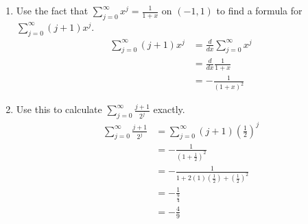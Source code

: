 \documentclass{article}
\begin{document}
\begin{enumerate}
\begin{enumerate}
\begin{proof}
                              Because $f(x)$ is continuously differentiable, we can be certain that
                              \begin{align*}
                                    \frac{d}{dx}\sum_{j=0}^\infty x^j & = \sum_{j=0}^\infty \frac{d}{dx} x^j \\
                                                                      & = \sum_{j=0}^\infty jx^{j-1}         \\
                                                                      & = 0 + \sum_{j=1}^\infty jx^{j-1}     \\
                                                                      & = \sum_{j=0}^\infty(j+1)x_j.
                              \end{align*}
                        \end{proof}
                  \item Use the fact that $\sum_{j=0}^\infty x^j=\frac{1}{1+x}$ on
                        $(-1,1)$ to find a formula for $\sum_{j=0}^\infty(j+1)x^j$.
                        \begin{align*}
                              \sum_{j=0}^\infty(j+1)x^j & = \frac{d}{dx}\sum_{j=0}^\infty x^j \\
                                                        & = \frac{d}{dx}\frac{1}{1+x}         \\
                                                        & = -\frac{1}{(1+x)^2}
                        \end{align*}
                  \item Use this to calculate $\sum_{j=0}^\infty\frac{j+1}{2^j}$ exactly.
                        \begin{align*}
                              \sum_{j=0}^\infty\frac{j+1}{2^j} & = \sum_{j=0}^\infty (j+1)\left(\frac{1}{2}\right)^j                    \\
                                                               & = -\frac{1}{\left(1+\frac{1}{2}\right)^2}                              \\
                                                               & = -\frac{1}{1+2(1)\left(\frac{1}{2}\right)+\left(\frac{1}{2}\right)^2} \\
                                                               & = -\frac{1}{\frac{9}{4}}                                               \\
                                                               & = -\frac{4}{9}

\end{align*}
\end{enumerate}
\end{enumerate}
\end{document}
